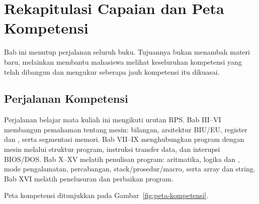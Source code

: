 \section{Rekapitulasi Capaian dan Peta Kompetensi}
\label{sec:rekap-capaian}

Bab ini menutup perjalanan seluruh buku. Tujuannya bukan menambah
materi baru, melainkan membantu mahasiswa melihat keseluruhan
kompetensi yang telah dibangun dan mengukur seberapa jauh
kompetensi itu dikuasai.

\subsection{Perjalanan Kompetensi}

Perjalanan belajar mata kuliah ini mengikuti urutan RPS. Bab III--VI
membangun pemahaman tentang mesin: bilangan, arsitektur BIU/EU,
register dan , serta segmentasi memori. Bab VII--IX
menghubungkan program dengan mesin melalui struktur program,
instruksi transfer data, dan interupsi BIOS/DOS. Bab X--XV melatih
penulisan program: aritmatika, logika dan , mode
pengalamatan, percabangan, stack/prosedur/macro, serta array dan
string. Bab XVI melatih penelusuran dan perbaikan program.

Peta kompetensi ditunjukkan pada Gambar~\ref{fig:peta-kompetensi}.

